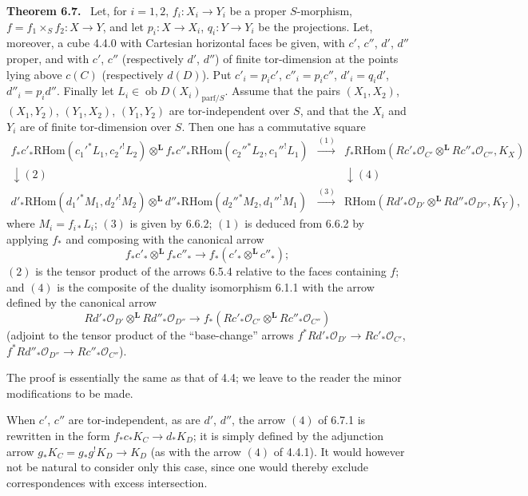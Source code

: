 \documentclass[11pt]{article}
\newenvironment{statement}[1]{\par\medskip\noindent\textbf{#1.}\ }{\par\medskip}
\newcommand{\ob}{\operatorname{ob}}
\providecommand{\RHom}{\mathrm{RHom}}
\providecommand{\parf}{\mathrm{parf}}
\providecommand{\LL}{\mathbf L}
\providecommand{\OO}{\mathcal O}
\begin{document}
\begin{statement}{Theorem 6.7}
Let, for $i=1,2$, $f_i:X_i\to Y_i$ be a proper $S$-morphism, $f=f_1\times_S f_2:X\to Y$, and let $p_i:X\to X_i$, $q_i:Y\to Y_i$ be the projections. Let, moreover, a cube 4.4.0 with Cartesian horizontal faces be given, with $c'$, $c''$, $d'$, $d''$ proper, and with $c'$, $c''$ (respectively $d'$, $d''$) of finite tor-dimension at the points lying above $c(C)$ (respectively $d(D)$). Put $c'_i=p_ic'$, $c''_i=p_ic''$, $d'_i=q_id'$, $d''_i=p_id''$. Finally let $L_i\in\ob D(X_i)_{\parf/S}$. Assume that the pairs $(X_1,X_2)$, $(X_1,Y_2)$, $(Y_1,X_2)$, $(Y_1,Y_2)$ are tor-independent over $S$, and that the $X_i$ and $Y_i$ are of finite tor-dimension over $S$. Then one has a commutative square
\begin{equation}
\tag{6.7.1}
\begin{array}{ccc}
f_*c'_*\RHom(c_1'^*L_1,c_2'^!L_2)\otimes^{\LL} f_*c''_*\RHom(c_2''^*L_2,c_1''^!L_1)
&\xrightarrow{(1)}&
f_*\RHom(Rc'_*\OO_{C'}\otimes^{\LL}Rc''_*\OO_{C''},K_X)\\[0.8em]
\downarrow{(2)}&&\downarrow{(4)}\\[0.8em]
d'_*\RHom(d_1'^*M_1,d_2'^!M_2)\otimes^{\LL} d''_*\RHom(d_2''^*M_2,d_1''^!M_1)
&\xrightarrow{(3)}&
\RHom(Rd'_*\OO_{D'}\otimes^{\LL}Rd''_*\OO_{D''},K_Y),
\end{array}
\end{equation}
where $M_i=f_{i*}L_i$; $(3)$ is given by 6.6.2; $(1)$ is deduced from 6.6.2 by applying $f_*$ and composing with the canonical arrow
\[
f_*c'_*\otimes^{\LL}f_*c''_*\longrightarrow f_*(c'_*\otimes^{\LL}c''_*);
\]
$(2)$ is the tensor product of the arrows 6.5.4 relative to the faces containing $f$; and $(4)$ is the composite of the duality isomorphism 6.1.1 with the arrow defined by the canonical arrow
\[
Rd'_*\OO_{D'}\otimes^{\LL}Rd''_*\OO_{D''}
\longrightarrow
f_*(Rc'_*\OO_{C'}\otimes^{\LL}Rc''_*\OO_{C''})
\]
(adjoint to the tensor product of the ``base-change'' arrows $f^*Rd'_*\OO_{D'}\to Rc'_*\OO_{C'}$, $f^*Rd''_*\OO_{D''}\to Rc''_*\OO_{C''}$).

The proof is essentially the same as that of 4.4; we leave to the reader the minor modifications to be made.

When $c'$, $c''$ are tor-independent, as are $d'$, $d''$, the arrow $(4)$ of 6.7.1 is rewritten in the form $f_*c_*K_C\to d_*K_D$; it is simply defined by the adjunction arrow $g_*K_C=g_*g^!K_D\to K_D$ (as with the arrow $(4)$ of 4.4.1). It would however not be natural to consider only this case, since one would thereby exclude correspondences with excess intersection.


\end{statement}
\end{document}
